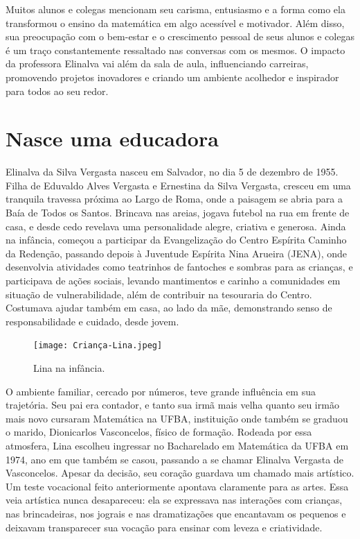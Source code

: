 \documentclass{hipatia}
\begin{document}
Muitos alunos e colegas mencionam seu carisma, entusiasmo e a forma como ela transformou o ensino da matemática em algo acessível e motivador. Além disso, sua preocupação com o bem-estar e o crescimento pessoal de seus alunos e colegas é um traço constantemente ressaltado nas conversas com os mesmos. O impacto da professora Elinalva vai além da sala de aula, influenciando carreiras, promovendo projetos inovadores e criando um ambiente acolhedor e inspirador para todos ao seu redor.  

\section{Nasce uma educadora}
Elinalva da Silva Vergasta nasceu em Salvador, no dia 5 de dezembro de 1955. Filha de Eduvaldo Alves Vergasta e Ernestina da Silva Vergasta, cresceu em uma tranquila travessa próxima ao Largo de Roma, onde a paisagem se abria para a Baía de Todos os Santos. Brincava nas areias, jogava futebol na rua em frente de casa, e desde cedo revelava uma personalidade alegre, criativa e generosa. Ainda na infância, começou a participar da Evangelização do Centro Espírita Caminho da Redenção, passando depois à Juventude Espírita Nina Arueira (JENA), onde desenvolvia atividades como teatrinhos de fantoches e sombras para as crianças, e participava de ações sociais, levando mantimentos e carinho a comunidades em situação de vulnerabilidade, além de contribuir na tesouraria do Centro. Costumava ajudar também em casa, ao lado da mãe, demonstrando senso de responsabilidade e cuidado, desde jovem. 


\begin{figure}[htb!]
\texttt{[image: Criança-Lina.jpeg]}
\caption{Lina na infância.}   
\end{figure}

O ambiente familiar, cercado por números, teve grande influência em sua trajetória. Seu pai era contador, e tanto sua irmã mais velha quanto seu irmão mais novo cursaram Matemática na UFBA, instituição onde também se graduou o marido, Dionicarlos Vasconcelos, físico de formação. Rodeada por essa atmosfera, Lina escolheu ingressar no Bacharelado em Matemática da UFBA em 1974, ano em que também se casou, passando a se chamar Elinalva Vergasta de Vasconcelos. Apesar da decisão, seu coração guardava um chamado mais artístico. Um teste vocacional feito anteriormente apontava claramente para as artes. Essa veia artística nunca desapareceu: ela se expressava nas interações com crianças, nas brincadeiras, nos jograis e nas dramatizações que encantavam os pequenos e deixavam transparecer sua vocação para ensinar com leveza e criatividade.  
\end{document}
